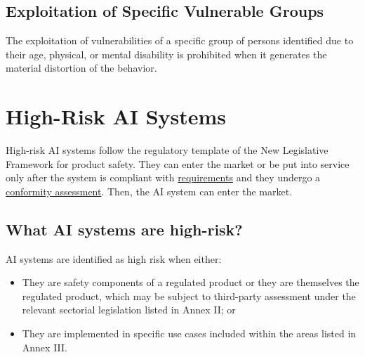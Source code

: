 \subsection{Exploitation of Specific Vulnerable Groups}
The exploitation of vulnerabilities of a specific group of persons identified due to their age, physical, or mental disability is prohibited when it generates the material distortion of the behavior.

\section{High-Risk AI Systems}\label{sec:High-risk-sys}
High-risk AI systems follow the regulatory template of the New Legislative Framework for product safety. They can enter the market or be put into service only after the system is compliant with \hyperref[sec:High-risk-req]{requirements} and they undergo a \hyperref[sec:Conformity-assessment]{conformity assessment}. Then, the AI system can enter the market.

\subsection{What AI systems are high-risk?}
AI systems are identified as high risk when either:
\begin{itemize}
    \item They are safety components of a regulated product or they are themselves the regulated product, which may be subject to third-party assessment under the relevant sectorial legislation listed in Annex II; or
    \item They are implemented in specific use cases included within the areas listed in Annex III.
\end{itemize}

